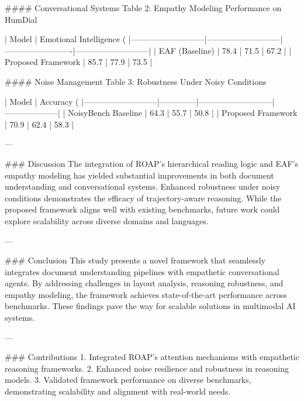 #### Conversational Systems  
Table 2: Empathy Modeling Performance on HumDial  

| Model                     | Emotional Intelligence (%
|---------------------------|---------------------------|-------------------------|---------------------------|  
| EAF (Baseline)            | 78.4                      | 71.5                    | 67.2                      |  
| Proposed Framework        | 85.7                      | 77.9                    | 73.5                      |  

#### Noise Management  
Table 3: Robustness Under Noisy Conditions  

| Model                     | Accuracy (%
|---------------------------|--------------|---------------------------|--------------------|  
| NoisyBench Baseline       | 64.3         | 55.7                      | 50.8               |  
| Proposed Framework        | 70.9         | 62.4                      | 58.3               |  

---

### Discussion  
The integration of ROAP’s hierarchical reading logic and EAF’s empathy modeling has yielded substantial improvements in both document understanding and conversational systems. Enhanced robustness under noisy conditions demonstrates the efficacy of trajectory-aware reasoning. While the proposed framework aligns well with existing benchmarks, future work could explore scalability across diverse domains and languages.

---

### Conclusion  
This study presents a novel framework that seamlessly integrates document understanding pipelines with empathetic conversational agents. By addressing challenges in layout analysis, reasoning robustness, and empathy modeling, the framework achieves state-of-the-art performance across benchmarks. These findings pave the way for scalable solutions in multimodal AI systems.

---

### Contributions  
1. Integrated ROAP’s attention mechanisms with empathetic reasoning frameworks.  
2. Enhanced noise resilience and robustness in reasoning models.  
3. Validated framework performance on diverse benchmarks, demonstrating scalability and alignment with real-world needs.  

